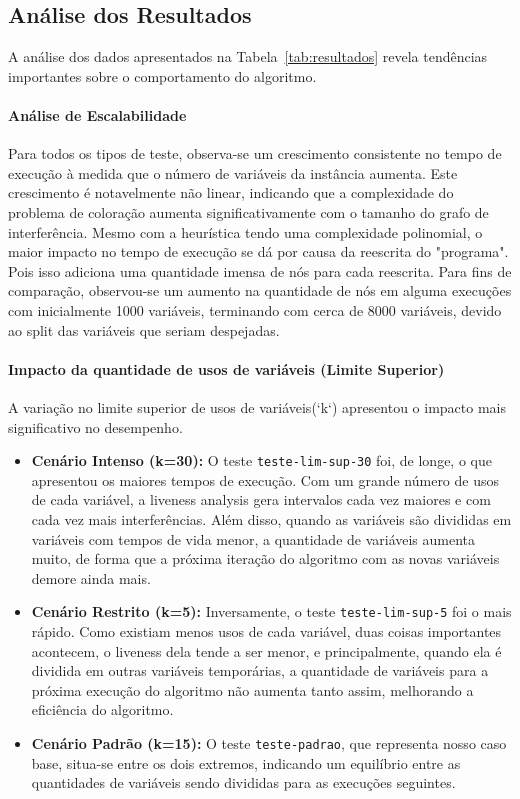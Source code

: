 \subsection{Análise dos Resultados}

A análise dos dados apresentados na Tabela~\ref{tab:resultados} revela tendências importantes sobre o comportamento do algoritmo.

\paragraph{Análise de Escalabilidade} Para todos os tipos de teste, observa-se um crescimento consistente no tempo de execução à medida que 
o número de variáveis da instância aumenta. Este crescimento é notavelmente não linear, indicando que a complexidade do problema de coloração
aumenta significativamente com o tamanho do grafo de interferência. Mesmo com a heurística tendo uma complexidade polinomial, o maior impacto no tempo
de execução se dá por causa da reescrita do "programa". Pois isso adiciona uma quantidade imensa de nós para cada reescrita. Para fins de comparação, observou-se
um aumento na quantidade de nós em alguma execuções com inicialmente 1000 variáveis, terminando com cerca de 8000 variáveis, devido ao split das variáveis que seriam
despejadas.


\paragraph{Impacto da quantidade de usos de variáveis (Limite Superior)} A variação no limite superior de usos de variáveis(`k`) apresentou o impacto
mais significativo no desempenho.
\begin{itemize}
    \item \textbf{Cenário Intenso (k=30):} O teste \texttt{teste-lim-sup-30} foi, de longe, o que apresentou os maiores tempos de execução. Com um grande número de usos de cada variável, a liveness analysis gera intervalos cada vez maiores e com cada vez mais interferências. Além disso, quando as variáveis são divididas em variáveis com tempos de vida menor, a quantidade de variáveis aumenta muito, de forma que a próxima iteração do algoritmo com as novas variáveis demore ainda mais.
    \item \textbf{Cenário Restrito (k=5):} Inversamente, o teste \texttt{teste-lim-sup-5} foi o mais rápido. Como existiam menos usos de cada variável, duas coisas importantes acontecem, o liveness dela tende a ser menor, e principalmente, quando ela é dividida em outras variáveis temporárias, a quantidade de variáveis para a próxima execução do algoritmo não aumenta tanto assim, melhorando a eficiência do algoritmo.
    \item \textbf{Cenário Padrão (k=15):} O teste \texttt{teste-padrao}, que representa nosso caso base, situa-se entre os dois extremos, indicando um equilíbrio entre as quantidades de variáveis sendo divididas para as execuções seguintes.
\end{itemize}

